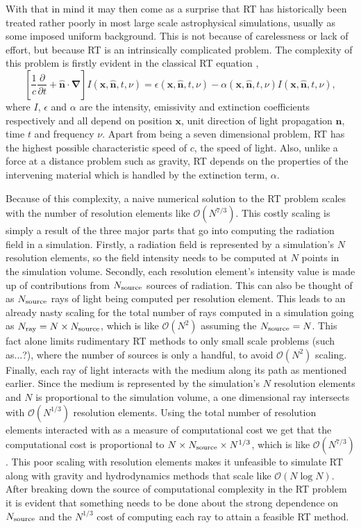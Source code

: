 \documentclass[fleq,usenatbib]{mnras}
\newcommand{\bigO}[1]{\mathcal{O}\left(#1\right)}
\newcommand{\NS}{N_{\rm source}}
\newcommand{\NR}{N_{\rm ray}}
\begin{document}
With that in mind it may then come as a surprise that RT has historically been 
treated rather poorly in most large scale astrophysical simulations, usually 
as some imposed uniform background. This is not because of carelessness or 
lack of effort, but because RT is an intrinsically complicated problem. The
complexity of this problem is firstly evident in the classical RT equation 
\citep[e.g.][]{mihalasMihalas84},
\begin{equation} \label{eqn:classicrt}
\left[ \frac{1}{c} \frac{\partial}{\partial t} + \mathbf{\hat{n} \cdot \nabla}
 \right] I\left(\mathbf{x}, \mathbf{\hat{n}}, t, \nu\right) = 
\epsilon\left(\mathbf{x}, \mathbf{\hat{n}}, t, \nu\right) - 
\alpha\left(\mathbf{x}, \mathbf{\hat{n}}, t, \nu\right) 
I\left(\mathbf{x}, \mathbf{\hat{n}}, t, \nu\right),
\end{equation} 
where $I$, $\epsilon$ and $\alpha$ are the intensity, emissivity and 
extinction coefficients respectively and all depend on position $\mathbf{x}$, 
unit direction of light propagation $\mathbf{\hat{n}}$, time $t$ and frequency 
$\nu$. Apart from being a seven dimensional problem, RT has the highest 
possible characteristic speed of $c$, the speed of light. Also, unlike a force 
at a distance problem such as gravity, RT depends on the properties of the 
intervening material which is handled by the extinction term, $\alpha$.

Because of this complexity, a naive numerical solution to the RT problem 
scales with the number of resolution elements like $\bigO{N^{7/3}}$. This 
costly scaling is simply a result of the three major parts that go into 
computing the radiation field in a simulation. Firstly, a radiation field is 
represented by a simulation's $N$ resolution elements, so the field intensity 
needs to be computed at $N$ points in the simulation volume. Secondly, each 
resolution element's intensity value is made up of contributions from $\NS$ 
sources of radiation. This can also be thought of as $\NS$ rays of light being 
computed per resolution element. This leads to an already nasty scaling for 
the total number of rays computed in a simulation going as $\NR = N 
\times \NS$, which is like $\bigO{N^2}$ assuming the $\NS = N$. This fact 
alone limits rudimentary RT methods to only small scale problems 
(such as...?), where the number of sources is only a handful, to avoid 
$\bigO{N^2}$ scaling. Finally, each ray of light interacts with the medium 
along its path as mentioned earlier. Since the medium is represented by the 
simulation's $N$ resolution elements and $N$ is proportional to the simulation 
volume, a one dimensional ray intersects with $\bigO{N^{1/3}}$ resolution 
elements. Using the total number of resolution elements interacted with as a 
measure of computational cost we get that the computational cost is 
proportional to $N \times \NS \times N^{1/3}$, which is like $\bigO{N^{7/3}}$. 
This poor scaling with resolution elements makes it unfeasible to simulate RT 
along with gravity and hydrodynamics methods that scale like $\bigO{N\log N}$. 
After breaking down the source of computational complexity in the RT problem 
it is evident that something needs to be done about the strong dependence on 
$\NS$ and the $N^{1/3}$ cost of computing each ray to attain a feasible RT 
method.
\end{document}
